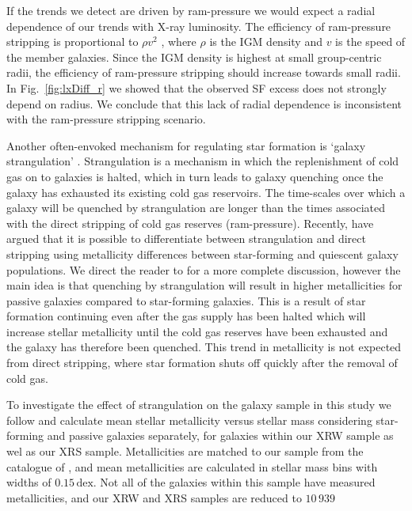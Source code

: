 If the trends we detect are driven by ram-pressure we would expect a
radial dependence of our trends with X-ray luminosity.  The efficiency
of ram-pressure stripping is proportional to $\rho v^2$
\citep{wake2005, popesso2007b}, where $\rho$ is the IGM density and
$v$ is the speed of the member galaxies.  Since the IGM density is
highest at small group-centric radii, the efficiency of ram-pressure
stripping should increase towards small radii.  In
Fig.~\ref{fig:lxDiff_r} we showed that the observed SF excess does not
strongly depend on radius.  We conclude that this lack of radial
dependence is inconsistent with the ram-pressure stripping scenario.
\par
Another often-envoked mechanism for regulating star formation is
`galaxy strangulation' \citep{larson1980, balogh2000, kawata2008,
  peng2015}.  Strangulation is a mechanism in which the replenishment
of cold gas on to galaxies is halted, which in turn leads to galaxy
quenching once the galaxy has exhausted its existing cold gas
reservoirs.  The time-scales over which a galaxy will be quenched by
strangulation are longer than the times associated with the direct
stripping of cold gas reserves (ram-pressure).  Recently,
\citet{peng2015} have argued that it is possible to differentiate
between strangulation and direct stripping using metallicity
differences between star-forming and quiescent galaxy populations.  We
direct the reader to \citet{peng2015} for a more complete discussion,
however the main idea is that quenching by strangulation will result
in higher metallicities for passive galaxies compared to star-forming
galaxies.  This is a result of star formation continuing even after
the gas supply has been halted which will increase stellar metallicity
until the cold gas reserves have been exhausted and the galaxy has
therefore been quenched.  This trend in metallicity is not expected
from direct stripping, where star formation shuts off quickly after
the removal of cold gas.
\par
To investigate the effect of strangulation on the galaxy sample in
this study we follow \citet{peng2015} and calculate mean stellar
metallicity versus stellar mass considering star-forming and passive
galaxies separately, for galaxies within our XRW sample as wel as our
XRS sample.  Metallicities are matched to our sample from the
catalogue of \citet{gallazzi2005}, and mean metallicities are
calculated in stellar mass bins with widths of $0.15\,\mathrm{dex}$.
Not all of the galaxies within this sample have measured
metallicities, and our XRW and XRS samples are reduced to $10\,939$
